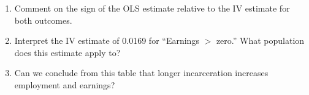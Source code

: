 \documentclass[11pt]{article}
\begin{document}
\begin{enumerate}[resume]
\begin{enumerate}[label=(\alph*)]
\item Comment on the sign of the OLS estimate relative to the IV estimate for both outcomes. 
\vspace{2.5cm}

\item Interpret the IV estimate of 0.0169 for
``Earnings $>$ zero.'' What population does this
estimate apply to?
\vspace{2cm}

\item Can we conclude from this table that longer
incarceration increases employment and earnings?

\vspace{2cm}
\end{enumerate}


\vspace{1.5cm}

\end{enumerate}
\end{document}
